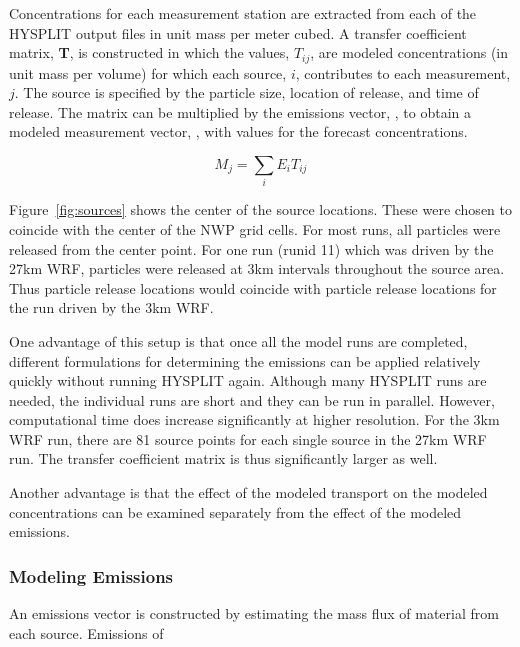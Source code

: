 Concentrations for each measurement station are extracted from each of the HYSPLIT  output files in unit mass per meter cubed. 
A transfer coefficient matrix, {\bf T}, is constructed in  
which the  values, $T_{ij}$,  are modeled concentrations (in unit mass per volume) for which each source, $i$,  contributes to each measurement, $j$.
The source is specified by the particle size, location of release, and time of release. 
The matrix can be multiplied by the emissions vector, , to obtain a modeled measurement vector, ,  with values for the forecast concentrations.

$$M_j = \sum_{i} E_i T_{ij} $$

Figure~\ref{fig:sources} shows the center of the source locations. These were chosen to coincide with the center of the NWP grid cells. For most runs, all particles
were released from the center point. For one run (runid 11) which was driven by the 27km WRF, particles were released at 3km intervals throughout the source area. Thus particle
release locations would coincide with particle release locations for the run driven by the 3km WRF.

One advantage of this setup is that once all the model runs are completed, different formulations for determining the emissions can
be applied relatively quickly without running HYSPLIT again. 
Although many HYSPLIT runs are needed, the individual runs are short and they can be run in parallel. However, computational time does
increase significantly at higher resolution. For the 3km WRF run, there are 81 source points for each single source in the 27km WRF run.
The transfer coefficient matrix is thus significantly larger as well.

Another advantage is that the effect of the modeled transport on the modeled concentrations can be examined separately from
the effect of the modeled emissions.   


\subsubsection{Modeling Emissions}

An emissions vector  is constructed by estimating the mass flux of material from each source.
Emissions of 

